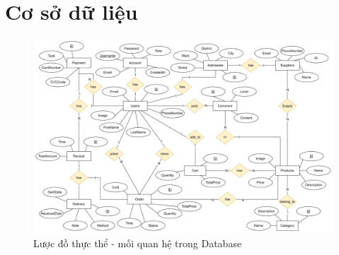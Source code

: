 \section{Cơ sở dữ liệu}
\begin{figure}[h]
    \centering
    \includegraphics[scale = 0.10]{img/erd.png}
    \vspace{1cm}
    \caption{Lược đồ thực thể - mối quan hệ trong Database}
    \label{fig:taskAssignment}
\end{figure}
